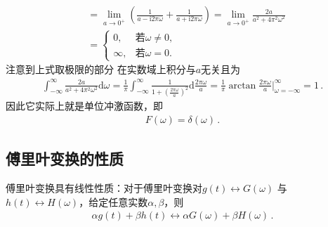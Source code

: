 \begin{prove}
\begin{align}
                  & =\lim\limits_{a\rightarrow0^+}\left(\frac{1}{a-\mathrm{i}2\pi\omega}+\frac{1}{a+\mathrm{i}2\pi\omega}\right)=\lim\limits_{a\rightarrow0^+}\frac{2a}{a^2+4\pi^2\omega^2}\nonumber        \\
                  & =\left\{\begin{array}{ll}
            0,      & \text{若}\omega\neq0, \\
            \infty, & \text{若}\omega=0.
        \end{array}\right.
    \end{align}
    注意到上式取极限的部分
    在实数域上积分与$a$无关且为
    \begin{align}
        \int_{-\infty}^{\infty}\frac{2a}{a^2+4\pi^2\omega^2}\mathrm{d}\omega
        =\frac{1}{\pi}\int_{-\infty}^{\infty}\frac{1}{1+\left(\frac{2\pi\omega}{a}\right)^2}\mathrm{d}\frac{2\pi\omega}{a}
        =\frac{1}{\pi}\arctan\frac{2\pi\omega}{a}\bigg|_{\omega=-\infty}^{\infty}=1\, .
    \end{align}
    因此它实际上就是单位冲激函数，即
    \begin{align}
        F(\omega)=\delta(\omega)\, .
    \end{align}
\end{prove}
\subsection{傅里叶变换的性质}\label{sub:傅里叶变换的性质}
\begin{theorem}
    傅里叶变换具有线性性质：对于傅里叶变换对$g(t)\leftrightarrow G(\omega)$
    与$h(t)\leftrightarrow H(\omega)$，给定任意实数$\alpha,\beta$，则
    \begin{align}
        \alpha g(t)+\beta h(t)\leftrightarrow \alpha G(\omega)+\beta H(\omega)\, .
    \end{align}
\end{theorem}

